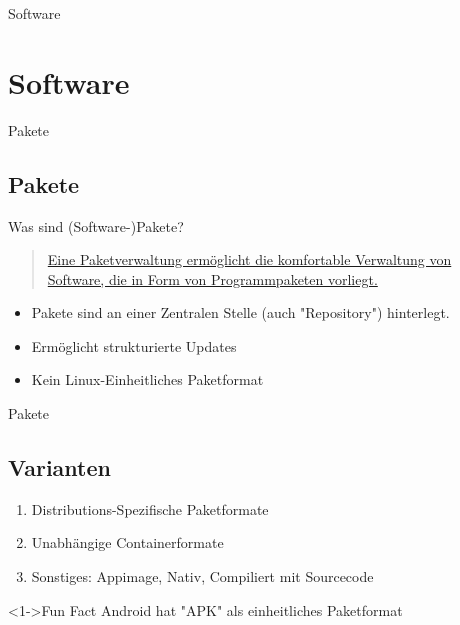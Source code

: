 
\begin{frame}{Software}
    \section{Software}\label{sec:software}
\end{frame}


\begin{frame}{Pakete}
    \subsection{Pakete}\label{subsec:pakete}

    \pause

    Was sind (Software-)Pakete?
    \pause

    \vspace{0.5cm}
    \begin{quote}
        \href{https://de.wikipedia.org/wiki/Paketverwaltung}{Eine Paketverwaltung ermöglicht die komfortable Verwaltung von Software, die in Form von Programmpaketen vorliegt.}
    \end{quote}
    \pause

    \begin{itemize}
        \item Pakete sind an einer Zentralen Stelle (auch "Repository") hinterlegt.\pause
        \item Ermöglicht strukturierte Updates\pause
        \item Kein Linux-Einheitliches Paketformat
    \end{itemize}
\end{frame}

\begin{frame}{Pakete}
    \subsection{Varianten}\label{subsec:varianten}


    \begin{enumerate}
        \item<3-> Distributions-Spezifische Paketformate
        \item<4-> Unabhängige Containerformate
        \item<5-> Sonstiges: Appimage, Nativ, Compiliert mit Sourcecode
    \end{enumerate}

    \vspace{0.5cm}
    \begin{exampleblock}<1->{Fun Fact}
        Android hat "APK" als einheitliches Paketformat
    \end{exampleblock}

\end{frame}

